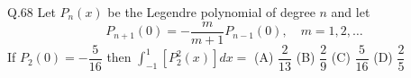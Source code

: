 \documentclass{article}
\begin{document}
																																																																																																											   Q.68 \quad Let $P_n(x)$ be the Legendre polynomial of degree $n$ and let
																																																																																																											   \[
																																																																																																											   P_{n+1}(0) = -\frac{m}{m+1} P_{n-1}(0), \quad m = 1, 2, \ldots
																																																																																																											   \]
																																																																																																											   If $P_2(0) = -\dfrac{5}{16}$ then $\int_{-1}^1 \left[P_2^2(x)\right] dx =$
																																																																																																											   \newline
																																																																																																											   (A) $\dfrac{2}{13}$ \hspace{2cm} (B) $\dfrac{2}{9}$ \hspace{2cm} (C) $\dfrac{5}{16}$ \hspace{2cm} (D) $\dfrac{2}{5}$
																																																																																																											   \vspace{1em} \newline
\end{document}
